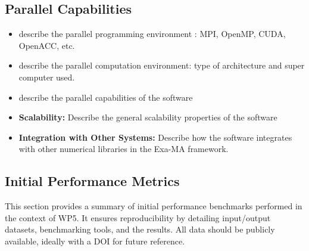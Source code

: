 \subsection{Parallel Capabilities}
\label{sec:WP5:Feelpp:performances}


\begin{itemize}
    \item describe the parallel programming  environment : MPI, OpenMP, CUDA, OpenACC, etc.
    \item describe the parallel computation environment: type of architecture and super computer used.
    \item describe the parallel capabilities of the software
    \item \textbf{Scalability:} Describe the general scalability properties of the software
    \item \textbf{Integration with Other Systems:} Describe how the software integrates with other numerical libraries in the Exa-MA framework.
\end{itemize}


\subsection{Initial Performance Metrics}
\label{sec:WP5:Feelpp:metrics}

This section provides a summary of initial performance benchmarks performed in the context of WP5. It ensures reproducibility by detailing input/output datasets, benchmarking tools, and the results. All data should be publicly available, ideally with a DOI for future reference.

